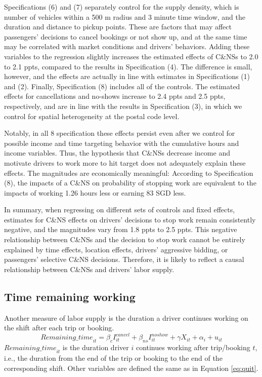 \documentclass[reviewmode]{AEA}
\begin{document}
Specifications (6) and (7) separately control for the supply density, which is number of vehicles within a 500 m radius and 3 minute time window, and the duration and distance to pickup points. These are factors that may affect passengers' decisions to cancel bookings or not show up, and at the same time may be correlated with market conditions and drivers' behaviors.  Adding these variables to the regression slightly increases the estimated effects of C\&NSs to 2.0 to 2.1 ppts, compared to the results in Specification (4). The difference is small, however, and the effects are actually in line with estimates in Specifications (1) and (2).  Finally, Specification (8) includes all of the controls. The estimated effects for cancellations and no-shows increase to 2.4 ppts and 2.5 ppts, respectively, 
and are in line with the results in Specification (3), in which we control for spatial heterogeneity at the postal code level.

Notably, in all 8 specification these effects persist even after we control for possible income and time targeting behavior with the cumulative hours and income variables. Thus, the hypothesis that C\&NSs decrease income and motivate drivers to work more to hit target does not adequately explain these effects. The magnitudes are economically meaningful: According to Specification (8), the impacts of a C\&NS on probability of stopping work are equivalent to the impacts of working 1.26 hours less or earning 83 SGD less.

In summary, when regressing on different sets of controls and fixed effects, estimates for C\&NS effects on drivers' decisions to stop work remain consistently negative, and the magnitudes vary
from 1.8 ppts to 2.5 ppts. This negative relationship between C\&NSs and the decision to stop work cannot be entirely explained by time effects, location effects, drivers' aggressive bidding, or passengers' selective C\&NS decisions. Therefore, it is likely to reflect a causal relationship between C\&NSs and drivers' labor supply.

\subsection{Time remaining working}
Another measure of labor supply is the duration a driver continues working on the shift after each trip or booking. 
\begin{equation}
\label{eq:rmins}
{Remaining\_time}_{it} = \beta_c I^{cancel}_{it} + \beta_{ns} I^{noshow}_{it}  + \gamma X_{it} + \alpha_i + u_{it}
\end{equation}
${Remaining\_time}_{it}$ is the duration driver $i$ continues working after trip/booking $t$, i.e., the duration from the end of the trip or booking to the end of the corresponding shift. %
Other variables are defined the same as in Equation \eqref{eq:quit}.
\end{document}
